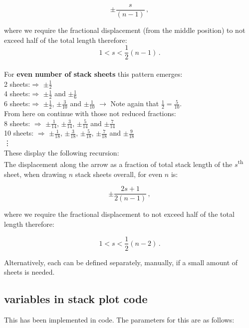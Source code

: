 \documentclass[12pt]{report}
\begin{document}
\[ \pm{ \frac{s}{ \left( n-1 \right) }}\,, \]

\noindent where we require the fractional displacement (from the middle position) to not exceed half of the total length therefore:\\
\[ 1 < s < \frac{1}{2} \left( n-1 \right)\,.\]\\

\noindent For {\bf even number of stack sheets} this pattern emerges:\\
\small
2 sheets:$\Rightarrow$ $\pm\frac{1}{2}$\\
4 sheets:$\Rightarrow$ $\pm\frac{1}{2}$ and $\pm\frac{1}{6}$\\
6 sheets:$\Rightarrow$ $\pm\frac{1}{2}$, $\pm\frac{3}{10}$ and $\pm\frac{1}{10}$ $\longrightarrow$ Note again that $\frac{1}{2} = \frac{5}{10}$.\\ From here on continue with those not reduced fractions:\\
8 sheets: $\Rightarrow$ $\pm\frac{1}{14}$, $\pm\frac{3}{14}$, $\pm\frac{5}{14}$ and $\pm\frac{7}{14}$\\
10 sheets:  $\Rightarrow$ $\pm\frac{1}{18}$, $\pm\frac{3}{18}$, $\pm\frac{5}{18}$, $\pm\frac{7}{18}$ and $\pm\frac{9}{18}$\\
\vdots\\
\normalsize
These display the following recursion:\\
The displacement along the arrow as a fraction of total stack length of the $s$\textsuperscript{th} sheet, when drawing $n$ stack sheets overall, for even $n$ is:

\[ \pm\frac{2s+1}{2 \left( n-1 \right) }\,, \]

\noindent where we require the fractional displacement to not exceed half of the total length therefore:

\[ 1 < s < \frac{1}{2} \left( n-2 \right)\,. \]

\noindent Alternatively, each can be defined separately, manually, if a small amount of sheets is needed.

\subsection{variables in stack plot code}

This has been implemented in code. The parameters for this are as follows:
\end{document}
